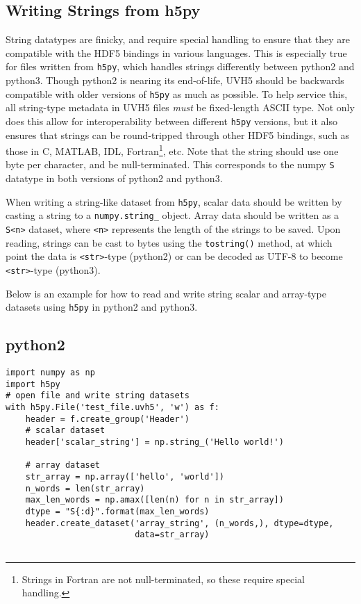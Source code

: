\documentclass[11pt, oneside]{article}
\begin{document}
\newpage

\begin{appendices}
\section{Writing Strings from h5py}
\label{appendix:strings}
String datatypes are finicky, and require special handling to ensure that they
are compatible with the HDF5 bindings in various languages. This is especially
true for files written from \verb+h5py+, which handles strings differently
between python2 and python3. Though python2 is nearing its end-of-life, UVH5
should be backwards compatible with older versions of \verb+h5py+ as much as
possible. To help service this, all string-type metadata in UVH5 files
\textit{must} be fixed-length ASCII type. Not only does this allow for
interoperability between different \verb+h5py+ versions, but it also ensures
that strings can be round-tripped through other HDF5 bindings, such as those in
C, MATLAB, IDL, Fortran\footnote{Strings in Fortran are not null-terminated, so
  these require special handling.}, etc. Note that the string should use one
byte per character, and be null-terminated. This corresponds to the numpy
\verb+S+ datatype in both versions of python2 and python3.

When writing a string-like dataset from \verb+h5py+, scalar data should be
written by casting a string to a \verb+numpy.string_+ object. Array data should
be written as a \verb+S<n>+ dataset, where \verb+<n>+ represents the length of
the strings to be saved. Upon reading, strings can be cast to bytes using the
\verb+tostring()+ method, at which point the data is \verb+<str>+-type (python2)
or can be decoded as UTF-8 to become \verb+<str>+-type (python3).

Below is an example for how to read and write string scalar and array-type
datasets using \verb+h5py+ in python2 and python3.

\subsection{python2}
\begin{verbatim}
import numpy as np
import h5py
# open file and write string datasets
with h5py.File('test_file.uvh5', 'w') as f:
    header = f.create_group('Header')
    # scalar dataset
    header['scalar_string'] = np.string_('Hello world!')

    # array dataset
    str_array = np.array(['hello', 'world'])
    n_words = len(str_array)
    max_len_words = np.amax([len(n) for n in str_array])
    dtype = "S{:d}".format(max_len_words)
    header.create_dataset('array_string', (n_words,), dtype=dtype,
                          data=str_array)


\end{verbatim}
\end{appendices}
\end{document}
